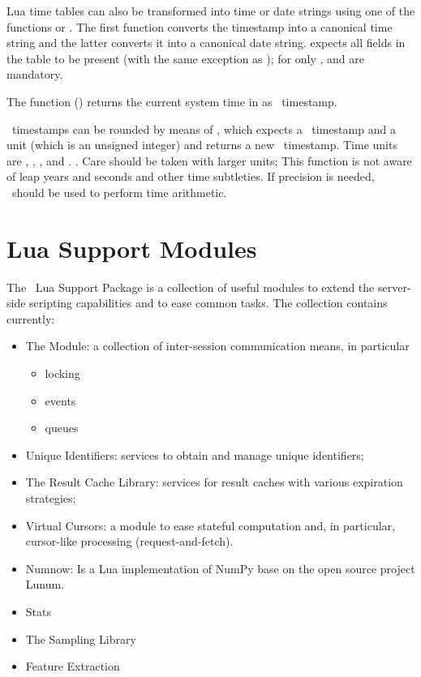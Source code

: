 Lua time tables can also be transformed into time or date
strings using one of the functions
 or
.
The first function converts the timestamp
into a canonical time string and the latter
converts it into a canonical date string.
 expects all fields in the
table to be present (with the same exception
as );
for  only ,
 and  are mandatory.

The function () returns
the current system time in 
as \nowdb\ timestamp.

\nowdb\ timestamps can be rounded by means of
, which expects a \nowdb\ time\-stamp
and a unit (which is an unsigned integer)
and returns a new \nowdb\ time\-stamp.
Time units are
,
,
,
 and
. .
Care should be taken with larger units;
This function is not aware of leap years and seconds
and other time subtleties. If precision is needed,
\sql\ should be used to perform time arithmetic.

\section{Lua Support Modules}\label{sec_luasupp}
The \nowdb\ Lua Support Package is a collection
of useful modules to extend the server-side
scripting capabilities and to ease common tasks.
The collection contains currently:

\begin{itemize}
\item The  Module:
      a collection of inter-session
      communication means, in particular
      \begin{itemize} 
      \item locking
      \item events
      \item queues
      \end{itemize} 
\item Unique Identifiers:
      services to obtain and manage unique identifiers;

\item The Result Cache Library:
      services for result caches with various
      expiration strategies;

\item Virtual Cursors:
      a module to ease stateful computation and,
      in particular, cursor-like processing (request-and-fetch).
       
\item Numnow:
      Is a Lua implementation of NumPy
      base on the open source project Lunum.
\item Stats
\item The Sampling Library
\item Feature Extraction
\end{itemize}

